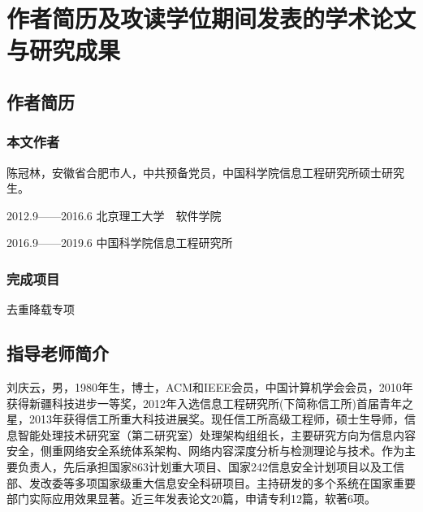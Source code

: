 \chapter{作者简历及攻读学位期间发表的学术论文与研究成果}

\section*{作者简历}

\subsection*{本文作者}
陈冠林，安徽省合肥市人，中共预备党员，中国科学院信息工程研究所硕士研究生。

2012.9——2016.6 北京理工大学~~软件学院

2016.9——2019.6 中国科学院信息工程研究所
\subsection*{完成项目}
去重降载专项

\section*{指导老师简介}
刘庆云，男，1980年生，博士，ACM和IEEE会员，中国计算机学会会员，2010年获得新疆科技进步一等奖，2012年入选信息工程研究所(下简称信工所)首届青年之星，2013年获得信工所重大科技进展奖。现任信工所高级工程师，硕士生导师，信息智能处理技术研究室（第二研究室）处理架构组组长，主要研究方向为信息内容安全，侧重网络安全系统体系架构、网络内容深度分析与检测理论与技术。作为主要负责人，先后承担国家863计划重大项目、国家242信息安全计划项目以及工信部、发改委等多项国家级重大信息安全科研项目。主持研发的多个系统在国家重要部门实际应用效果显著。近三年发表论文20篇，申请专利12篇，软著6项。
\cleardoublepage[plain]%

